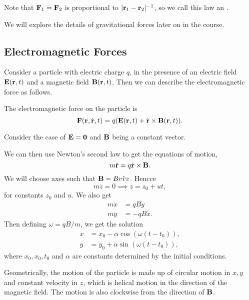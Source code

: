 \documentclass[a4paper]{scrreprt}
\begin{document}
Note that $\mathbf{F}_1 = \mathbf{F}_2$ is proportional to $|\mathbf{r}_1 - \mathbf{r}_2|^{-1}$, so we call this law an .

We will explore the details of gravitational forces later on in the course.

\subsection{Electromagnetic Forces}

Consider a particle with electric charge $q$, in the presence of an electric field $\mathbf{E}(\mathbf{r}, t)$ and a magnetic field $\mathbf{B}(\mathbf{r}, t)$. Then we can describe the electromagnetic force as follows.

\begin{law*}
	The electromagnetic force on the particle is
	$$
	\mathbf{F}(\mathbf{r}, \dot{\mathbf{r}}, t) = q(\mathbf{E}(\mathbf{r}, t) + \dot{\mathbf{r}} \times \mathbf{B}(\mathbf{r}, t)).
	$$
\end{law*}

\begin{example}
	Consider the case of $\mathbf{E} = \mathbf{0}$ and $\mathbf{B}$ being a constant vector.

	We can then use Newton's second law to get the equations of motion,
	$$
	m \ddot{\mathbf{r}} = q \dot{\mathbf{r}} \times \mathbf{B}.
	$$
	We will choose axes such that $\mathbf{B} = B \hat{vv{z}}$. Hencce
	$$
	m \ddot{z} = 0 \implies z = z_0 + ut,
	$$
	for constants $z_0$ and $u$. We also get
	\begin{align*}
		m \ddot{x} &= qB \dot{y}\\
		m \ddot{y} &= -qB \dot{x}.
	\end{align*}
	Then defining $\omega  = qB/m$, we get the solution
	\begin{align*}
		x &= x_0 - \alpha \cos (\omega(t - t_0)),\\
		y &= y_0 + \alpha \sin(\omega(t - t_0)),
	\end{align*}
	where $x_0, x_0, t_0$ and $\alpha$ are constants determined by the initial conditions.

	Geometrically, the motion of the particle is made up of circular motion in $x, y$ and constant velocity in $z$, which is helical motion in the direction of the magnetic field. The motion is also clockwise from the direction of $\mathbf{B}$.
\end{example}
\end{document}
